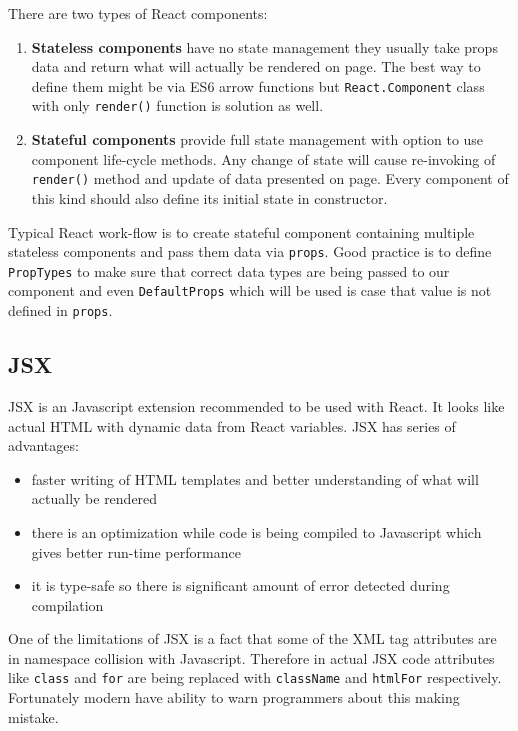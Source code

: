 There are two types of React components\cite{React}:
\begin{enumerate}
\item \textbf{Stateless components} have no state management they usually take props data and return what will actually be rendered on page. The best way to define them might be via ES6 arrow functions\cite{arrowFunctions} but \texttt{React.Component} class with only \texttt{render()} function is solution as well.

\item \textbf{Stateful components} provide full state management with option to use component life-cycle methods. Any change of state will cause re-invoking of \texttt{render()} method and update of data presented on page. Every component of this kind should also define its initial state in constructor.
\end{enumerate}

Typical React work-flow is to create stateful component containing multiple stateless components and pass them data via \texttt{props}. Good practice is to define \texttt{PropTypes} to make sure that correct data types are being passed to our component and even \texttt{DefaultProps} which will be used is case that value is not defined in \texttt{props}. 

\subsection{JSX} 
JSX\cite{JSX} is an Javascript extension recommended to be used with React. It looks like actual HTML with dynamic data from React variables. JSX has series of advantages:
\begin{itemize}
\item faster writing of HTML templates and better understanding of what will actually be rendered
\item there is an optimization while code is being compiled to Javascript which gives better run-time performance
\item it is type-safe so there is significant amount of error detected during compilation
\end{itemize}  

One of the limitations of JSX is a fact that some of the XML tag attributes are in namespace collision with Javascript. Therefore in actual JSX code attributes like \texttt{class} and \texttt{for} are being replaced with \texttt{className} and \texttt{htmlFor} respectively. Fortunately modern have ability to warn programmers about this making mistake. 

